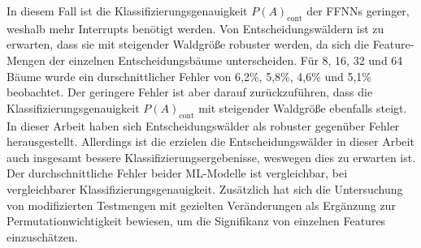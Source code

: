 In diesem Fall ist die Klassifizierungsgenauigkeit $P(A)_{\text{cont}}$ der FFNNs geringer, weshalb mehr Interrupts benötigt werden.
\newline
\newline
Von Entscheidungswäldern ist zu erwarten, dass sie mit steigender Waldgröße robuster werden, da sich die Feature-Mengen der einzelnen Entscheidungsbäume unterscheiden.
Für 8, 16, 32 und 64 Bäume wurde ein durschnittlicher Fehler von 6,2\%, 5,8\%, 4,6\% und 5,1\% beobachtet.
Der geringere Fehler ist aber darauf zurückzuführen, dass die Klassifizierungsgenauigkeit $P(A)_{\text{cont}}$ mit steigender Waldgröße ebenfalls steigt.
\newline
\newline
In dieser Arbeit haben sich Entscheidungswälder als robuster gegenüber Fehler herausgestellt.
Allerdings ist die erzielen die Entscheidungswälder in dieser Arbeit auch insgesamt bessere Klassifizierungsergebenisse, weswegen dies zu erwarten ist.
Der durchschnittliche Fehler beider ML-Modelle ist vergleichbar, bei vergleichbarer Klassifizierungsgenauigkeit.
Zusätzlich hat sich die Untersuchung von modifizierten Testmengen mit gezielten Veränderungen als Ergänzung zur Permutationwichtigkeit bewiesen,
um die Signifikanz von einzelnen Features einzuschätzen.